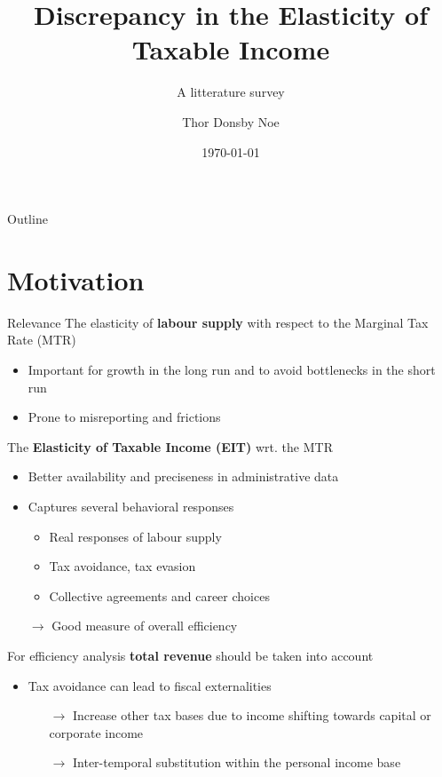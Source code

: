 \documentclass[8pt]{beamer}
\title{Discrepancy in the Elasticity of Taxable Income}
\subtitle{A litterature survey}
\date{\today}
\author{Thor Donsby Noe}
\institute{Public Economics II: Theory of Taxation \\
          w. Javier Vázquez-Grenno}
\begin{document}
\maketitle


\begin{frame}{Outline}
  \tableofcontents
\end{frame}


\section{Motivation}


\begin{frame}{Relevance}
  The elasticity of \textbf{labour supply} with respect to the Marginal Tax Rate (MTR)
  \begin{itemize}
    \item Important for growth in the long run and to avoid bottlenecks in the short run
    \item Prone to misreporting and frictions
  \end{itemize}
  The \textbf{Elasticity of Taxable Income (EIT)} wrt. the MTR
  \begin{itemize}
    \item Better availability and preciseness in administrative data
    \item Captures several behavioral responses
    \begin{itemize}
      \item Real responses of labour supply
      \item Tax avoidance, tax evasion
      \item Collective agreements and career choices
    \end{itemize}
    \item[$\rightarrow$] Good measure of overall efficiency
  \end{itemize}
  For efficiency analysis \textbf{total revenue} should be taken into account
  \begin{itemize}
    \item Tax avoidance can lead to fiscal externalities
    \begin{itemize}
      \item[$\rightarrow$] Increase other tax bases due to income shifting towards capital or corporate income
      \item[$\rightarrow$] Inter-temporal substitution within the personal income base
    \end{itemize}
  \end{itemize}
\end{frame}
\end{document}
